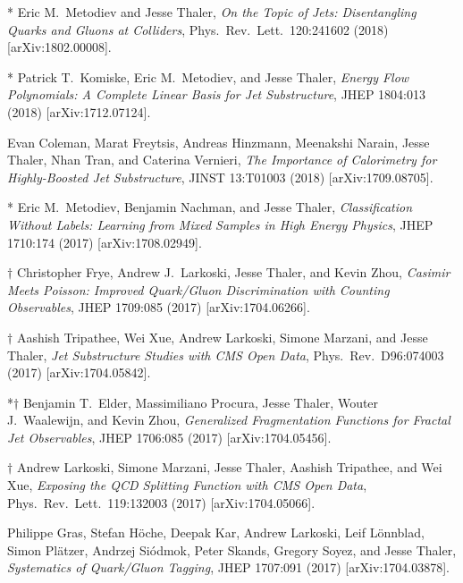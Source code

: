 \begin{list}{[]\addtocounter{jessecount}{-1}}{\leftmargin=3em \itemsep=4pt}
\item
* Eric M.\ Metodiev and Jesse Thaler,
\emph{On the Topic of Jets: Disentangling Quarks and Gluons at Colliders},
Phys.\ Rev.\ Lett.\ 120:241602 (2018)
[arXiv:1802.00008].

\item
* Patrick T.\ Komiske, Eric M.\ Metodiev, and Jesse Thaler,
\emph{Energy Flow Polynomials: A Complete Linear Basis for Jet Substructure},
JHEP 1804:013 (2018)
[arXiv:1712.07124].

\item
 Evan Coleman, Marat Freytsis, Andreas Hinzmann, Meenakshi Narain, Jesse Thaler, Nhan Tran, and Caterina Vernieri,
\emph{The Importance of Calorimetry for Highly-Boosted Jet Substructure},
JINST 13:T01003 (2018)
[arXiv:1709.08705].

\item
* Eric M.\ Metodiev, Benjamin Nachman, and Jesse Thaler,
\emph{Classification Without Labels: Learning from Mixed Samples in High Energy Physics},
JHEP 1710:174 (2017)
[arXiv:1708.02949].

\item
$\dagger$ Christopher Frye, Andrew J.\ Larkoski, Jesse Thaler, and Kevin Zhou,
\emph{Casimir Meets Poisson: Improved Quark/Gluon Discrimination with Counting Observables},
JHEP 1709:085 (2017)
[arXiv:1704.06266].

\item
$\dagger$ Aashish Tripathee, Wei Xue, Andrew Larkoski, Simone Marzani, and Jesse Thaler,
\emph{Jet Substructure Studies with CMS Open Data},
Phys.\ Rev.\ D96:074003 (2017)
[arXiv:1704.05842].

\item
*$\dagger$ Benjamin T.\ Elder, Massimiliano Procura, Jesse Thaler, Wouter J.\ Waalewijn, and Kevin Zhou,
\emph{Generalized Fragmentation Functions for Fractal Jet Observables},
JHEP 1706:085 (2017)
[arXiv:1704.05456].

\item
$\dagger$ Andrew Larkoski, Simone Marzani, Jesse Thaler, Aashish Tripathee, and Wei Xue,
\emph{Exposing the QCD Splitting Function with CMS Open Data},
Phys.\ Rev.\ Lett.\ 119:132003 (2017)
[arXiv:1704.05066].

\item
 Philippe Gras, Stefan Höche, Deepak Kar, Andrew Larkoski, Leif Lönnblad, Simon Plätzer, Andrzej Siódmok, Peter Skands, Gregory Soyez, and Jesse Thaler,
\emph{Systematics of Quark/Gluon Tagging},
JHEP 1707:091 (2017)
[arXiv:1704.03878].


\end{list}
